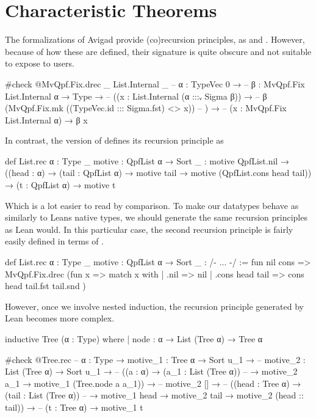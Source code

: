 \section{Characteristic Theorems}

The formalizations of Avigad \etal{} provide (co)recursion principles, as  and .
However, because of how these are defined, their signature is quite obscure and not suitable to expose to users.
\begin{leancode}
  #check @MvQpf.Fix.drec _ List.Internal _
  -- {α : TypeVec 0} →
  --   {β : MvQpf.Fix List.Internal α → Type} →
  --     ((x : List.Internal (α :::ᵥ Sigma β)) → 
  --        β (MvQpf.Fix.mk ((TypeVec.id ::: Sigma.fst) <$$> x))
  --     ) →
  --       (x : MvQpf.Fix List.Internal α) → β x
\end{leancode}

In contrast, the \inductive{} version of  defines its recursion principle as
\begin{leancode}
  def List.rec {α : Type _} {motive : QpfList α → Sort _} :
  motive QpfList.nil 
    → ((head : α) → (tail : QpfList α) → motive tail 
                                          → motive (QpfList.cons head tail))
    → (t : QpfList α) 
    → motive t
\end{leancode}

Which is a lot easier to read by comparison. To make our datatypes behave as similarly to Leans native
\inductive{} types, we should generate the same recursion principles as Lean would.
In this particular case, the second recursion principle is fairly easily defined in terms of .
\begin{leancode}
  def List.rec {α : Type _} {motive : QpfList α → Sort _} : /- ... -/ :=
    fun nil cons => MvQpf.Fix.drec (fun x => 
      match x with
      | .nil            => nil
      | .cons head tail => cons head tail.fst tail.snd
    )
\end{leancode}

However, once we involve nested induction, the recursion principle generated by Lean becomes more complex.

\begin{leancode}
  inductive Tree (α : Type) where
  | node : α → List (Tree α) → Tree α

  #check @Tree.rec
  -- {α : Type} → {motive_1 : Tree α → Sort u_1} →
  --   {motive_2 : List (Tree α) → Sort u_1} →
  --   ((a : α) → (a_1 : List (Tree α)) 
  --        → motive_2 a_1 → motive_1 (Tree.node a a_1)) →
  --   motive_2 [] →
  --   ((head : Tree α) → (tail : List (Tree α)) 
  --        → motive_1 head → motive_2 tail → motive_2 (head :: tail)) →
  --   (t : Tree α) → motive_1 t
\end{leancode}


